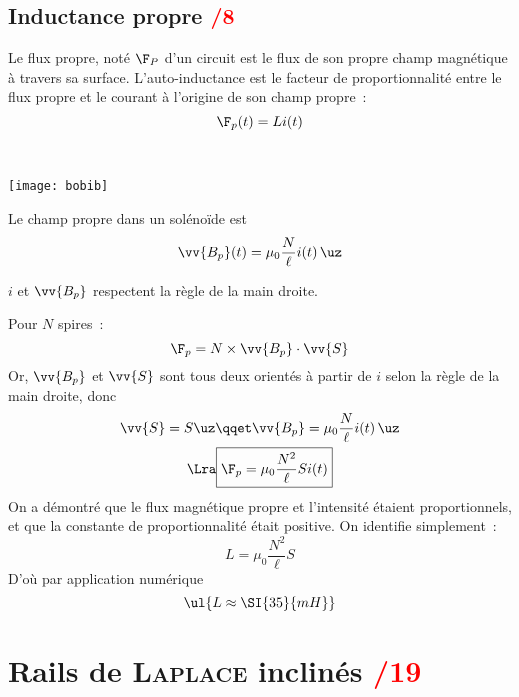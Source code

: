 \documentclass[11pt]{book}
\begin{document}
{	\subsection{Inductance propre \hfill \textcolor{red}{/8}}
	\label{ssec:indprp}
	\begin{enumerate}[start=11]
		 Le flux propre, noté $\F_P$ d'un circuit est le flux de son propre
		champ magnétique à travers sa surface.
		 L'auto-inductance est le facteur de proportionnalité entre le flux
		propre et le courant à l'origine de son champ propre~:
		\[
			\F_p(t) = Li(t)
		\]
		 \noindent
		\begin{minipage}[t]{.4\linewidth}
			~
			\begin{center}
				\texttt{[image: bobib]}
				\label{fig:bobib}
			\end{center}
		\end{minipage}
		\hfill
		\begin{minipage}[t]{.69\linewidth}
			Le champ propre dans un solénoïde est
			\[
				\vv{B_p}(t) = \mu_0 \frac{N}{\ell }i(t)\,\uz
			\]

			$i$ et $\vv{B_p}$ respectent la règle de la main droite.
		\end{minipage}
		Pour $N$ spires~:
		\[
			\F_p = N\times \vv{B_p}\cdot \vv{S}
		\]
		Or, $\vv{B_p}$ et $\vv{S}$ sont tous deux orientés à partir de $i$ selon
		la règle de la main droite, donc
		\begin{gather*}
			\vv{S} = S\uz
			\qqet
			\vv{B_p} = \mu_0 \frac{N}{\ell }i(t)\,\uz
			\\\Lra
			\boxed{\F_p = \mu_0 \frac{N^2}{\ell }Si(t)}
		\end{gather*}
		On a démontré que le flux magnétique propre et l'intensité étaient
		proportionnels, et que la constante de proportionnalité était positive.
		On identifie simplement~:
		\[
			\boxed{L = \mu_0 \frac{N^2}{\ell }S}
		\]
		D'où par application numérique
		\[
			\ul{L \approx \SI{35}{mH}}
		\]

	\end{enumerate}
}

\section{Rails de \textsc{Laplace} inclinés \hfill \textcolor{red}{/19}}
\label{sec:rlplincl}
\end{document}
